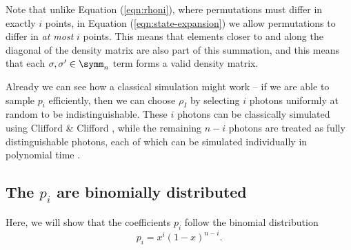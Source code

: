 Note that unlike Equation (\ref{eqn:rhoni}), where permutations must differ in exactly $i$ points, in Equation (\ref{eqn:state-expansion}) we allow permutations to differ in \emph{at most} $i$ points. 
This means that elements closer to and along the diagonal of the density matrix are also part of this summation, and this means that each $\sigma,\sigma' \in \symm_n$ term forms a valid density matrix.

Already we can see how a classical simulation might work -- if we are able to sample $p_i$ efficiently, then we can choose $\rho_I$ by selecting $i$ photons uniformly at random to be indistinguishable. 
These $i$ photons can be classically simulated using Clifford \& Clifford \cite{clifford2017}, while the remaining $n-i$ photons are treated as fully distinguishable photons, each of which can be simulated individually in polynomial time \cite{aaronson2014,neville2017}.


\subsection{The $p_i$ are binomially distributed}
\label{sec:understanding-pi}

Here, we will show that the coefficients $p_i$ follow the binomial distribution
\begin{equation}
p_i = x^i(1-x)^{n-i}.
\end{equation}


